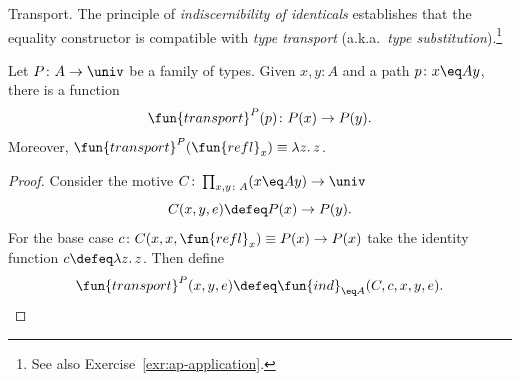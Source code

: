 \begin{lpar}{Transport.}\label{lpar:transport}
    The principle of \textsl{indiscernibility of identicals} establishes that the equality constructor is compatible with \textsl{type transport} (a.k.a.~\textsl{type substitution}).\footnote{See also Exercise~\ref{exr:ap-application}.}
        
\begin{thm}\label{thm:transportP}
    Let\/ $P\colon A\to\univ$ be a family of types. Given\/ $x,y\colon A$ and a path\/ $p\colon x\eq A y$, there is a function
    \[
        \fun{transport}^P(p)\colon P(x)\to P(y).
    \]
    Moreover, $\fun{transport}^P(\fun{refl}_x) \equiv \lambda z.\,z$.
\end{thm}

\begin{proof}
    Consider the motive $C\colon\prod_{x,y\colon A}(x\eq Ay)\to\univ$
    \[
        C(x,y,e)\defeq P(x)\to P(y).
    \]
    For the base case $c\colon C(x,x,\fun{refl}_x)\equiv P(x)\to P(x)$ take the identity function $c\defeq\lambda z.\,z$. Then define
    \[
        \fun{transport}^P(x,y,e)\defeq\fun{ind}_{\eq A}(C,c,x,y,e).
    \]
\end{proof}
\end{lpar}


